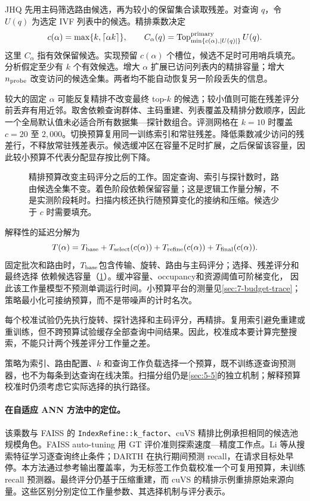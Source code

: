 JHQ 先用主码筛选路由候选，再为较小的保留集合读取残差\cite{jhq}。对查询 $q$，令 $U(q)$ 为选定 IVF 列表中的候选。精排乘数决定
\begin{equation}
 c(\alpha)=\max\{k,\lceil\alpha k\rceil\},\qquad
 C_\alpha(q)=\operatorname{Top}^{\rm primary}_{\min\{c(\alpha),|U(q)|\}}U(q).
 \label{eq:6-budget}
\end{equation}
这里 $C_\alpha$ 指有效保留候选。实现预留 $c(\alpha)$ 个槽位，候选不足时可用哨兵填充。分析假定至少有 $k$ 个有效候选。增大 $\alpha$ 扩展已访问列表内的精排容量；增大 $n_{\rm probe}$ 改变访问的候选全集。两者均不能自动恢复另一阶段丢失的信息。

较大的固定 $\alpha$ 可能反复精排不改变最终 top-$k$ 的候选；较小值则可能在残差评分前丢弃有用近邻。取舍依赖查询群体、主码重建、列表覆盖及精排分数顺序，因此一个全局默认值未必适合所有数据集—探针数组合。评测网格在 $k=10$ 时覆盖 $c=20$ 至 $2{,}000$。切换预算复用同一训练索引和常驻残差。降低乘数减少访问的残差行，不释放常驻残差表示。候选缓冲区在容量不足时扩展，之后保留该容量，因此较小预算不代表分配显存按比例下降。

\begin{figure}[tbp]
\centering

\caption[精排预算影响的工作范围]{精排预算改变主码评分之后的工作。固定查询、索引与探针数时，路由候选全集不变。着色阶段依赖保留容量；这是逻辑工作量分解，不是实测阶段耗时。扫描内核还执行随预算变化的接纳和压缩。候选少于 $c$ 时需要填充。}
\label{fig:6-budget-scope}
\end{figure}

解释性的延迟分解为
\begin{equation}
 T(\alpha)=T_{\rm base}+T_{\rm select}(c(\alpha))+
 T_{\rm refine}(c(\alpha))+T_{\rm final}(c(\alpha)).
 \label{eq:6-cost-model}
\end{equation}
固定批次和路由时，$T_{\rm base}$包含传输、旋转、路由与主码评分；选择、残差评分和最终选择
依赖候选容量（\cref{fig:6-budget-scope}）。缓冲容量、occupancy和资源阈值可阶梯变化，
因此该工作量模型不预测单调运行时间。小预算平台的测量见\cref{sec:7-budget-trace}；
策略最小化可接纳预算，而不是带噪声的计时名次。


每个校准试验仍先执行旋转、探针选择和主码评分，再精排。复用索引避免重建或重训练，但不跨预算试验缓存全部查询中间结果。因此，校准成本要计算完整搜索，不能只计两个残差评分工作量之差。

策略为索引、路由配置、$k$ 和查询工作负载选择一个预算，既不训练逐查询预测器，也不为每条到达查询在线决策。扫描分组仍是\cref{sec:5-5}的独立机制；解释预算校准时仍须考虑它实际选择的执行路径。

\paragraph{在自适应 ANN 方法中的定位。}
该乘数与 FAISS 的 \texttt{IndexRefine::k\_factor}、cuVS 精排比例承担相同的候选池规模角色\cite{faiss_refine,cuvs_refinement}。FAISS auto-tuning 用 GT 评价准则探索速度—精度工作点\cite{faiss_autotune}。Li 等从搜索特征学习逐查询终止条件\cite{li_termination}；DARTH 在执行期间预测 recall，在请求目标处早停\cite{darth}。本方法通过参考输出覆盖率，为无标签工作负载校准一个可复用预算，未训练 recall 预测器。最终评分仍基于压缩重建，而 cuVS 的精排示例重排原始来源向量。这些区别分别定位工作量参数、其选择机制与评分表示。
